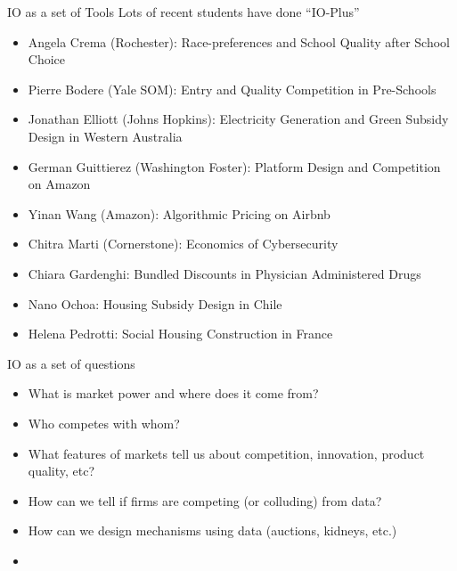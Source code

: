 \begin{frame}{IO as a set of Tools}
Lots of recent students have done ``IO-Plus''
\begin{itemize}
    \item Angela Crema (Rochester): Race-preferences and School Quality after School Choice
    \item Pierre Bodere (Yale SOM): Entry and Quality Competition in Pre-Schools
    \item Jonathan Elliott (Johns Hopkins): Electricity Generation and Green Subsidy Design in Western Australia
    \item German Guittierez (Washington Foster): Platform Design and Competition on Amazon
    \item Yinan Wang (Amazon): Algorithmic Pricing on Airbnb
    \item Chitra Marti (Cornerstone): Economics of Cybersecurity
    \item Chiara Gardenghi: Bundled Discounts in Physician Administered Drugs
    \item Nano Ochoa: Housing Subsidy Design in Chile
    \item Helena Pedrotti: Social Housing Construction in France
\end{itemize}
\end{frame}



\begin{frame}{IO as a set of questions}
\begin{itemize}
    \item What is market power and where does it come from?
    \item Who competes with whom?
    \item What features of markets tell us about competition, innovation, product quality, etc?
    \item How can we tell if firms are competing (or colluding) from data?
    \item How can we design mechanisms using data (auctions, kidneys, etc.)
    \item 
\end{itemize}
\end{frame}





















































